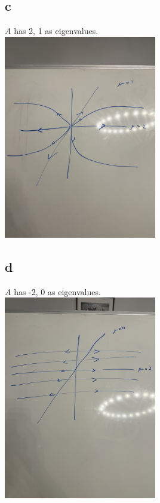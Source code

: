 \documentclass{article}
\begin{document}
\subsection*{c}
$A$ has 2, 1 as eigenvalues.\\
\includegraphics[width=0.5\textwidth]{IMG_2798.jpg}
\subsection*{d}
$A$ has -2, 0 as eigenvalues.\\
\includegraphics[width=0.5\textwidth]{IMG_2799.jpg}
\end{document}
